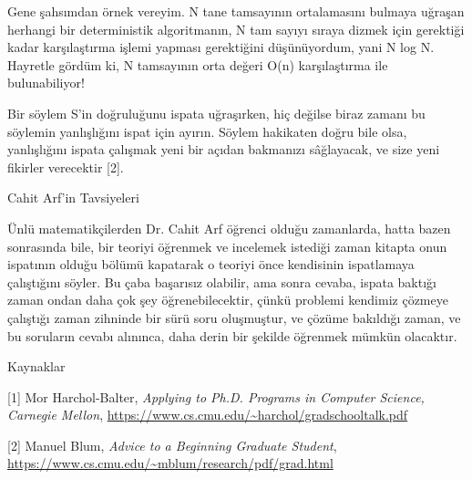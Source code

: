 \documentclass[12pt,fleqn]{article}\usepackage{../../common}
\begin{document}
Gene şahsımdan örnek vereyim. N tane tamsayının ortalamasını bulmaya
uğraşan herhangi bir deterministik algoritmanın, N tam sayıyı sıraya dizmek
için gerektiği kadar karşılaştırma işlemi yapması gerektiğini düşünüyordum,
yani N log N. Hayretle gördüm ki, N tamsayının orta değeri O(n)
karşılaştırma ile bulunabiliyor!

Bir söylem S'in doğruluğunu ispata uğraşırken, hiç değilse biraz zamanı
bu söylemin yanlışlığını ispat için ayırın. Söylem hakikaten doğru bile
olsa, yanlışlığını ispata çalışmak yeni bir açıdan bakmanızı sâğlayacak, ve
size yeni fikirler verecektir [2].

Cahit Arf'in Tavsiyeleri

Ünlü matematikçilerden Dr. Cahit Arf öğrenci olduğu zamanlarda, hatta bazen
sonrasında bile, bir teoriyi öğrenmek ve incelemek istediği zaman kitapta
onun ispatının olduğu bölümü kapatarak o teoriyi önce kendisinin
ispatlamaya çalıştığını söyler. Bu çaba başarısız olabilir, ama sonra
cevaba, ispata baktığı zaman ondan daha çok şey öğrenebilecektir, çünkü
problemi kendimiz çözmeye çalıştığı zaman zihninde bir sürü soru
oluşmuştur, ve çözüme bakıldığı zaman, ve bu soruların cevabı alınınca,
daha derin bir şekilde öğrenmek mümkün olacaktır.

Kaynaklar

[1] Mor Harchol-Balter, 
    {\em Applying to Ph.D. Programs in Computer Science, Carnegie Mellon}, 
    \url{https://www.cs.cmu.edu/~harchol/gradschooltalk.pdf}

[2] Manuel Blum, 
    {\em Advice to a Beginning Graduate Student}, 
    \url{https://www.cs.cmu.edu/~mblum/research/pdf/grad.html}
\end{document}
